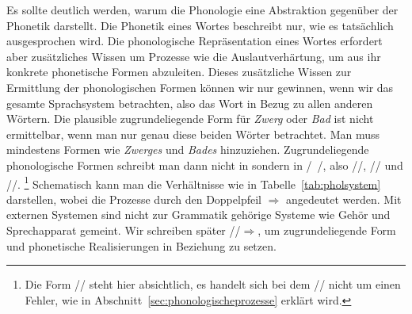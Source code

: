 
Es sollte deutlich werden, warum die Phonologie eine Abstraktion gegenüber der Phonetik darstellt.
Die Phonetik eines Wortes beschreibt nur, wie es tatsächlich ausgesprochen wird.
Die phonologische Repräsentation eines Wortes erfordert aber zusätzliches Wissen um Prozesse wie die Auslautverhärtung, um aus ihr konkrete phonetische Formen abzuleiten.
Dieses zusätzliche Wissen zur Ermittlung der phonologischen Formen können wir nur gewinnen, wenn wir das gesamte Sprachsystem betrachten, also \zB das Wort in Bezug zu allen anderen Wörtern.
Die plausible zugrundeliegende Form für \textit{Zwerg} oder \textit{Bad} ist \zB nicht ermittelbar, wenn man nur genau diese beiden Wörter betrachtet.
Man muss mindestens Formen wie \textit{Zwerges} und \textit{Bades} hinzuziehen.
Zugrundeliegende phonologische Formen schreibt man dann nicht in \textipa{[~]} sondern in /~/, also \zB //, // und //.%
\footnote{Die Form // steht hier absichtlich, es handelt sich bei dem // nicht um einen Fehler, wie in Abschnitt~\ref{sec:phonologischeprozesse} erklärt wird.}
Schematisch kann man die Verhältnisse wie in Tabelle~\ref{tab:pholsystem} darstellen, wobei die Prozesse durch den Doppelpfeil $\Rightarrow$ angedeutet werden.
Mit externen Systemen sind nicht zur Grammatik gehörige Systeme wie Gehör und Sprechapparat gemeint.
Wir schreiben später //$\Rightarrow$\textipa{[ba:t]}, um zugrundeliegende Form und phonetische Realisierungen in Beziehung zu setzen.

\begin{table}[!h]
  \caption{Lexikon, Phonologie und Phonetik}
  \label{tab:pholsystem}
\end{table}

